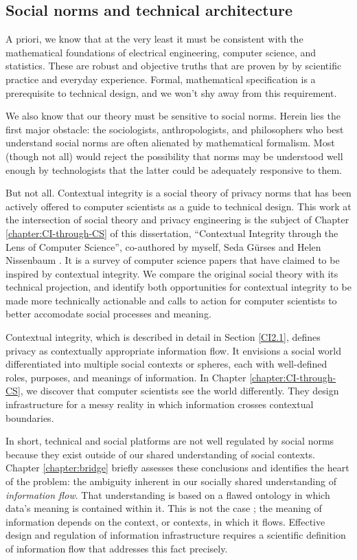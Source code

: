 \documentclass[../thesis.tex]{subfiles}
\begin{document}
 \subsection{Social norms and technical architecture}

 A priori, we know that at the very least it must be
 consistent with the mathematical foundations of
 electrical engineering, computer science, and statistics.
 These are robust and objective truths that are proven
 by by scientific practice and everyday experience.
 Formal, mathematical specification is a prerequisite
 to technical design, and we won't shy away from this
 requirement.

 We also know that our theory must be sensitive to social
 norms.
 Herein lies the first major obstacle: the
 sociologists, anthropologists, and philosophers who best
 understand social norms are often alienated by
 mathematical formalism.
 Most (though not all) would reject the possibility that
 norms may be understood well enough by technologists
 that the latter could be adequately responsive to them.

 But not all.
 Contextual integrity is a social theory of privacy norms
 that has been actively offered to computer scientists
 as a guide to technical design.
 This work at the intersection of social theory and
 privacy engineering is the subject of 
 Chapter \ref{chapter:CI-through-CS} of this
 dissertation, ``Contextual Integrity through the Lens of Computer Science'', co-authored by myself, Seda G{\"u}rses and Helen Nissenbaum \cite{benthall2017contextual}.
 It is a survey of computer science papers that have claimed
 to be inspired by contextual integrity.
 We compare the original social theory with its technical projection, and identify both opportunities for contextual integrity to be made more technically actionable and calls to action for computer scientists to better accomodate social processes and meaning.

 Contextual integrity, which is described in detail in
 Section \ref{CI2.1}, defines privacy as contextually
 appropriate information flow.
 It envisions a social world differentiated into multiple
 social contexts or spheres, each with well-defined
 roles, purposes, and meanings of information.
 In Chapter \ref{chapter:CI-through-CS}, we discover that
 computer scientists see the world differently.
 They design infrastructure for a messy reality in which
 information crosses contextual boundaries.

 In short, technical and social platforms are not well
 regulated by social norms because they exist outside
 of our shared understanding of social contexts.
 Chapter \ref{chapter:bridge} briefly assesses these conclusions
 and identifies the  heart of the problem:
 the ambiguity inherent in our socially shared
 understanding of \textit{information flow}.
 That understanding is based on a flawed ontology
 in which data's meaning is contained within it.
 This is not the case \cite{horvitz2015data};
 the meaning of information depends on the context,
 or contexts, in which it flows.
 Effective design and regulation of information
 infrastructure requires a scientific
 definition of information flow that addresses this
 fact precisely.
 
\end{document}
